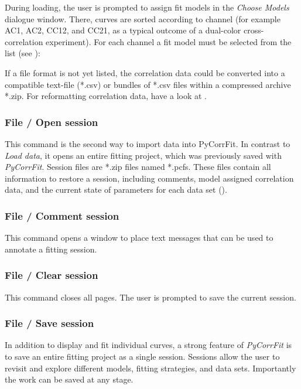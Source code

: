 During loading, the user is prompted to assign fit models in the \textit{Choose Models} dialogue window. There, curves are sorted according to channel (for example AC1, AC2, CC12, and CC21, as a typical outcome of a dual-color cross-correlation experiment). For each channel a fit model must be selected from the list (see ):

If a file format is not yet listed, the correlation data could be converted into a compatible text-file (*.csv) or bundles of *.csv files within a compressed archive *.zip. For reformatting correlation data, have a look at .

\subsubsection{File / Open session}
\label{sec:menub.filem.opens}
This command is the second way to import data into PyCorrFit. In contrast to \textit{Load data}, it opens an entire fitting project, which was previously saved with \textit{PyCorrFit}. Session files are *.zip files named *.pcfs. These files contain all information to restore a session, including comments, model assigned correlation data, and the current state of parameters for each data set ().

\subsubsection{File / Comment session}
\label{sec:menub.filem.comme}
This command opens a window to place text messages that can be used to annotate a fitting session.

\subsubsection{File / Clear session}
\label{sec:menub.filem.clear}
This command closes all pages. The user is prompted to save the current session.

\subsubsection{File / Save session}
\label{sec:menub.filem.saves}
In addition to display and fit individual curves, a strong feature of \textit{PyCorrFit} is to save an entire fitting project as a single session. Sessions allow the user to revisit and explore different models, fitting strategies, and data sets. Importantly the work can be saved at any stage.

